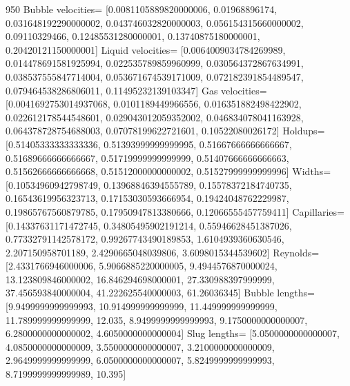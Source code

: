 \documentclass{article}
\begin{document}
950
Bubble velocities= [0.0081105889820000006, 0.01968896174, 0.031648192290000002,
0.043746032820000003, 0.056154315660000002, 0.09110329466, 0.12485531280000001, 0.13740875180000001,
0.20420121150000001]
Liquid velocities= [0.0064009034784269989, 0.014478691581925994, 0.022535789859960999,
0.030564372867634991, 0.038537555847714004, 0.053671674539171009, 0.072182391854489547,
0.079464538286806011, 0.11495232139103347]
Gas velocities= [0.0041692753014937068, 0.0101189449966556, 0.016351882498422902,
0.022612178544548601, 0.029043012059352002, 0.046834078041163928, 0.064378728754688003,
0.07078199622721601, 0.10522080026172]
Holdups= [0.51405333333333336, 0.51393999999999995, 0.51667666666666667, 0.51689666666666667,
0.51719999999999999, 0.51407666666666663, 0.51562666666666668, 0.51512000000000002,
0.51527999999999996]
Widths= [0.10534960942798749, 0.13968846394555789, 0.15578372184740735, 0.16543619956323713,
0.17153030593666954, 0.19424048762229987, 0.19865767560879785, 0.17950947813380666,
0.12066555457759411]
Capillaries= [0.14337631171472745, 0.34805495902191214, 0.55946628451387026, 0.77332791142578172,
0.99267743490189853, 1.6104939360630546, 2.207150958701189, 2.4290665048039806, 3.6098015344539602]
Reynolds= [2.4331766946000006, 5.9066885220000005, 9.4944576870000024, 13.123809846000002,
16.846294698000001, 27.330988397999999, 37.456593840000004, 41.222625540000003, 61.26036345]
Bubble lengths= [9.9499999999999993, 10.914999999999999, 11.449999999999999, 11.789999999999999,
12.035, 8.9499999999999993, 9.1750000000000007, 6.2800000000000002, 4.6050000000000004]
Slug lengths= [5.0500000000000007, 4.0850000000000009, 3.5500000000000007, 3.2100000000000009,
2.9649999999999999, 6.0500000000000007, 5.8249999999999993, 8.7199999999999989, 10.395]
\end{document}
